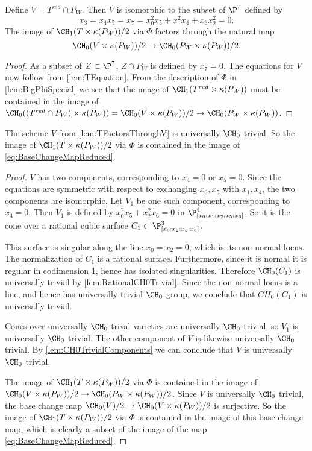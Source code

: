\begin{lemma}
  \label{lem:TFactorsThroughV}
  Define $V = T^{red} \cap P_W$. Then $V$ is isomorphic to the subset of $\P^7$ defined by
\[x_3 = x_4x_5 = x_7 = x_0^2x_5 + x_1^2x_4 + x_6x_2^2 = 0.\]
  The image of $\CH_1(T \times \kappa(P_W))/2$ via $\Phi$ factors through the natural map \[\CH_0(V \times \kappa(P_W))/2 \to \CH_0(P_W \times \kappa(P_W))/2.\]
\end{lemma}
\begin{proof}
As a subset of $Z \subset \P^7$, $Z \cap P_W$ is defined by $x_7=0$. The equations for $V$ now follow from \cref{lem:TEquation}.
From the description of $\Phi$ in \cref{lem:BigPhiSpecial} we see that the image of $\CH_1(T^{red} \times \kappa(P_W))$ must be contained in the image of $\CH_0((T^{red} \cap P_W) \times \kappa(P_W)) = \CH_0(V \times \kappa(P_W))/2 \to \CH_0(P_W \times \kappa(P_W))$.
\end{proof}

\begin{lemma}
  \label{lem:VUniversallyTrivial}
  The scheme $V$ from \cref{lem:TFactorsThroughV} is universally $\CH_0$ trivial. So the image of $\CH_1(T \times \kappa(P_W))/2$ via $\Phi$ is contained in the image of \eqref{eq:BaseChangeMapReduced}.
\end{lemma}
\begin{proof}
  $V$ has two components, corresponding to $x_4=0$ or $x_5=0$. Since the equations are symmetric with respect to exchanging $x_0, x_5$ with $x_1, x_4$, the two components are isomorphic. Let $V_1$ be one such component, corresponding to $x_4 =0$. Then $V_1$ is defined by $x_0^2x_5 + x_2^2x_6 = 0$ in $\P^4_{[x_0:x_1:x_2:x_5:x_6]}$. So it is the cone over a rational cubic surface $C_1 \subset \P^3_{[x_0:x_2:x_5:x_6]}$.
  
  This surface is singular along the line $x_0 = x_2 = 0$, which is its non-normal locus. The normalization of $C_1$ is a rational surface. Furthermore, since it is normal it is regular in codimension 1, hence has isolated singularities. Therefore $\CH_0(C_1)$ is universally trivial by \cref{lem:RationalCH0Trivial}. Since the non-normal locus is a line, and hence has universally trivial $\CH_0$ group, we conclude that $CH_0(C_1)$ is universally trivial. 
  
  Cones over universally $\CH_0$-trival varieties are universally $\CH_0$-trivial, so $V_1$ is universally $\CH_0$-trivial. The other component of $V$ is likewise universally $\CH_0$ trivial. By \cref{lem:CH0TrivialComponents} we can conclude that $V$ is universally $\CH_0$ trivial.

The image of $\CH_1(T \times \kappa(P_W))/2$ via $\Phi$ is contained in the image of $\CH_0(V \times \kappa(P_W))/2 \to \CH_0(P_W \times \kappa(P_W))/2$. Since $V$ is universally $\CH_0$ trivial, the base change map $\CH_0(V)/2 \to \CH_0(V \times \kappa(P_W))/2$ is surjective. So the image of $\CH_1(T \times \kappa(P_W))/2$ via $\Phi$ is contained in the image of this base change map, which is clearly a subset of the image of the map \eqref{eq:BaseChangeMapReduced}.
\end{proof}

